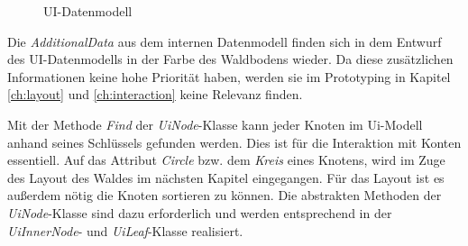 \begin{figure}[htb]
\caption{UI-Datenmodell}
\label{fig:ui-model}
\end{figure}

Die \textit{AdditionalData} aus dem internen Datenmodell finden sich in dem Entwurf des UI-Datenmodells in der Farbe des Waldbodens wieder. Da diese zusätzlichen Informationen keine hohe Priorität haben, werden sie im Prototyping in Kapitel \ref{ch:layout} und \ref{ch:interaction} keine Relevanz finden.

Mit der Methode \textit{Find} der \textit{UiNode}-Klasse kann jeder Knoten im Ui-Modell anhand seines Schlüssels gefunden werden. Dies ist für die Interaktion mit Konten essentiell. Auf das Attribut \textit{Circle} bzw. dem \textit{Kreis} eines Knotens, wird im Zuge des Layout des Waldes im nächsten Kapitel eingegangen. Für das Layout ist es außerdem nötig die Knoten sortieren zu können. Die abstrakten Methoden der \textit{UiNode}-Klasse sind dazu erforderlich und werden entsprechend in der \textit{UiInnerNode}- und \textit{UiLeaf}-Klasse realisiert.


